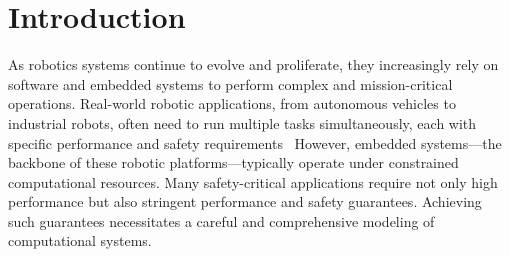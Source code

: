 
	\section{Introduction}









	As robotics systems continue to evolve and proliferate, they increasingly rely on software and
	embedded systems to perform complex and mission-critical operations. Real-world robotic
	applications, from autonomous vehicles to industrial robots, often need to run multiple tasks
	simultaneously, each with specific performance and safety
	requirements~\cite{Heintzman2021-mw, Percept21_RTSS, Ash23RAL}
	However, embedded systems—the backbone of these robotic
	platforms—typically operate under constrained computational resources. Many safety-critical
	applications require not only high performance but also stringent performance and safety
	guarantees. Achieving such guarantees necessitates a careful and comprehensive modeling of
	computational systems.

